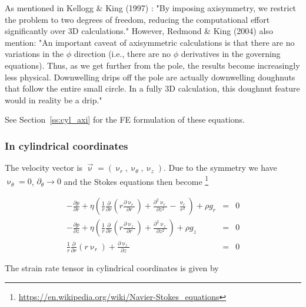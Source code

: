 As mentioned in Kellogg \& King (1997) \cite{keki97}: "By imposing axisymmetry,
we restrict the problem to two degrees of freedom, reducing the computational
effort significantly over 3D calculations."
However, Redmond \& King (2004) \cite{reki04} also mention:
"An important caveat of axisymmetric calculations is that there are no variations 
in the $\phi$ direction (i.e., there are no $\phi$ derivatives in
the governing equations). Thus, as we get further from
the pole, the results become increasingly less physical.
Downwelling drips off the pole are actually downwelling
doughnuts that follow the entire small circle. In a fully
3D calculation, this doughnut feature would in reality be a drip."


See Section~\ref{ss:cyl_axi} for the FE formulation of these equations.

\subsubsection{In cylindrical coordinates}

The velocity vector is $\vec{\upnu}=(\upnu_r,\upnu_\theta,\upnu_z)$. 
Due to the symmetry we have $\upnu_\theta=0$, $\partial_\theta \rightarrow 0$ 
and the Stokes equations 
then become \footnote{\url{https://en.wikipedia.org/wiki/Navier-Stokes_equations}}

\begin{eqnarray}
-\frac{\partial p}{\partial r} + \eta
\left(
\frac1r \frac{\partial}{\partial r} ( r  \frac{\partial \upnu_r}{\partial r}   ) 
+  \frac{\partial^2 \upnu_r}{\partial z^2} - \frac{\upnu_r}{r^2}
\right) +\rho g_r&=& 0 
\\
-\frac{\partial p}{\partial z} + \eta
\left(
\frac1r \frac{\partial}{\partial r} ( r  \frac{\partial \upnu_z}{\partial r}   ) 
+  \frac{\partial^2 \upnu_z}{\partial z^2} 
\right) +\rho g_z&=& 0 \\
\frac1r \frac{\partial}{\partial r} (r \upnu_r) + \frac{\partial \upnu_z}{\partial z} &=& 0
\end{eqnarray}


The strain rate tensor in cylindrical coordinates is given by 


